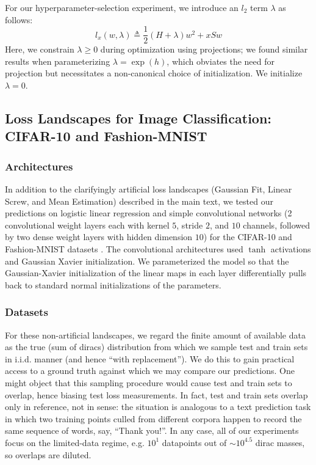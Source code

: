 \documentclass{article}
\theoremstyle{plain}
\theoremstyle{definition}
\begin{document}
            For our hyperparameter-selection experiment, we introduce an $l_2$
            term $\lambda$ as follows:
            $$
                l_x(w, \lambda)
                \triangleq
                \frac{1}{2} (H + \lambda) w^2 + x S w
            $$
            Here, we constrain $\lambda\geq 0$ during optimization using
            projections; we found similar results when parameterizing
            $\lambda = \exp(h)$, which obviates the need for projection but
            necessitates a non-canonical choice of initialization.  We
            initialize $\lambda=0$.

    \subsection{
        Loss Landscapes for Image Classification: CIFAR-10 and Fashion-MNIST
    }
        \subsubsection*{Architectures}
            In addition to the clarifyingly artificial loss landscapes
            (Gaussian Fit, Linear Screw, and Mean Estimation) described in the
            main text, we tested our predictions on logistic linear regression
            and simple convolutional networks (2 convolutional weight layers
            each with kernel $5$, stride $2$, and $10$ channels, followed by
            two dense weight layers with hidden dimension $10$) for the
            CIFAR-10 \cite{kr09} and Fashion-MNIST datasets \cite{xi17}.  The
            convolutional architectures used $\tanh$ activations and Gaussian
            Xavier initialization.  We parameterized the model so that the
            Gaussian-Xavier initialization of the linear maps in each layer
            differentially pulls back to standard normal initializations of the
            parameters.
            
        \subsubsection*{Datasets}
            For these non-artificial landscapes, we regard the finite amount of
            available data as the true (sum of diracs) distribution from which
            we sample test and train sets in i.i.d.  manner (and hence ``with
            replacement'').  We do this to gain practical access to a ground
            truth against which we may compare our predictions.  One might
            object that this sampling procedure would cause test and train sets
            to overlap, hence biasing test loss measurements.  In fact, test
            and train sets overlap only in reference, not in sense: the
            situation is analogous to a text prediction task in which two
            training points culled from different corpora happen to record the
            same sequence of words, say, ``Thank you!''.  In any case, all of
            our experiments focus on the limited-data regime, e.g. $10^1$
            datapoints out of $\sim 10^{4.5}$ dirac masses, so overlaps are
            diluted. 
\end{document}
